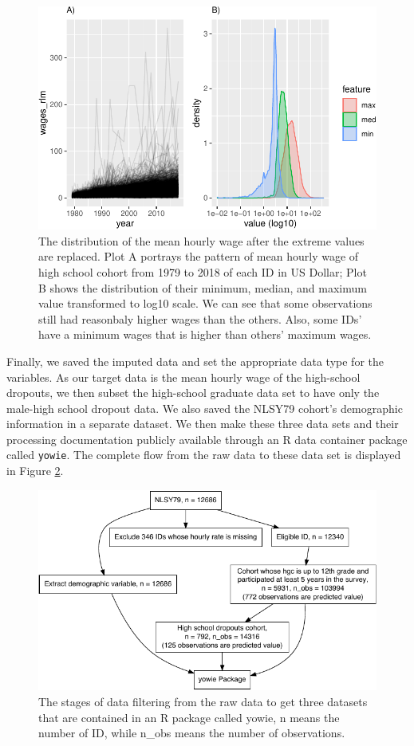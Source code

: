 \documentclass{article}
\begin{document}
\begin{figure}
\centering
\includegraphics{figures/comppict-1.pdf}
\caption{\label{fig:comppict}The distribution of the mean hourly wage after the extreme values are replaced. Plot A portrays the pattern of mean hourly wage of high school cohort from 1979 to 2018 of each ID in US Dollar; Plot B shows the distribution of their minimum, median, and maximum value transformed to log10 scale. We can see that some observations still had reasonbaly higher wages than the others. Also, some IDs' have a minimum wages that is higher than others' maximum wages.}
\end{figure}

Finally, we saved the imputed data and set the appropriate data type for the variables. As our target data is the mean hourly wage of the high-school dropouts, we then subset the high-school graduate data set to have only the male-high school dropout data. We also saved the NLSY79 cohort's demographic information in a separate dataset. We then make these three data sets and their processing documentation publicly available through an R data container package called \texttt{yowie}. The complete flow from the raw data to these data set is displayed in Figure \ref{fig:flow-chart}.

\begin{figure}
\centering
\includegraphics{figures/flow-chart-1.pdf}
\caption{\label{fig:flow-chart}The stages of data filtering from the raw data to get three datasets that are contained in an R package called yowie, n means the number of ID, while n\_obs means the number of observations.}
\end{figure}
\end{document}
